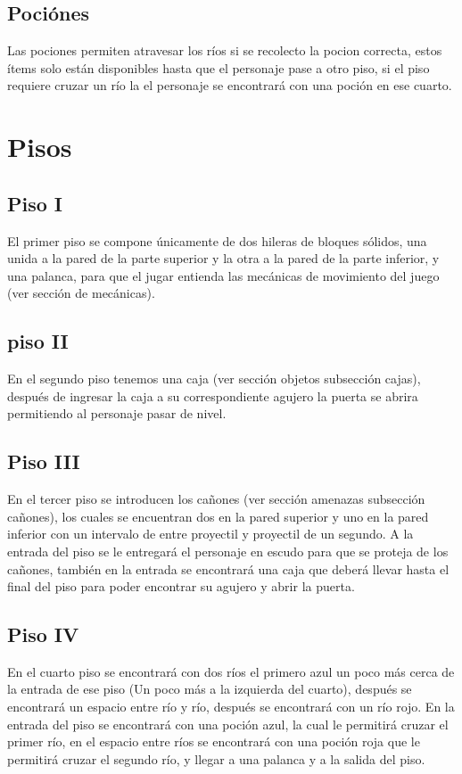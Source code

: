 \documentclass{article}
\begin{document}
\subsection{Pociónes}
Las pociones permiten atravesar los ríos si se recolecto la pocion correcta, estos ítems solo están disponibles hasta que el personaje pase a otro piso, si el piso requiere cruzar un río la el personaje se encontrará con una poción en ese cuarto.
\section{Pisos}\label{intro}
\subsection{Piso I}
El primer piso se compone únicamente de dos hileras de bloques sólidos, una unida a la pared de la parte superior y la otra a la pared de la parte inferior, y una palanca, para que el jugar entienda las mecánicas de movimiento del juego (ver sección de mecánicas).
\subsection{piso II}
En el segundo piso tenemos una caja (ver sección objetos subsección cajas), después de ingresar la caja a su correspondiente agujero la puerta se abrira permitiendo al personaje pasar de nivel.
\subsection{Piso III}
En el tercer piso se introducen los cañones (ver sección amenazas subsección cañones), los cuales se encuentran  dos en la pared superior y uno en la pared inferior con un intervalo de entre proyectil y proyectil de un segundo. A la entrada del piso se le entregará el personaje en escudo para que se proteja de los cañones, también en la entrada se encontrará una caja que deberá llevar hasta el final del piso para poder encontrar su agujero y abrir la puerta.
\subsection{Piso IV}
En el cuarto piso se encontrará con dos ríos el primero azul un poco más cerca de la entrada de ese piso (Un poco más a la izquierda del cuarto), después se encontrará un espacio entre río y río, después se encontrará con un río rojo. En la entrada del piso se encontrará con una poción azul, la cual le permitirá cruzar el primer río, en el espacio entre ríos se encontrará con una poción roja que le permitirá cruzar el segundo río, y llegar a una palanca y a la salida del piso.
\end{document}
